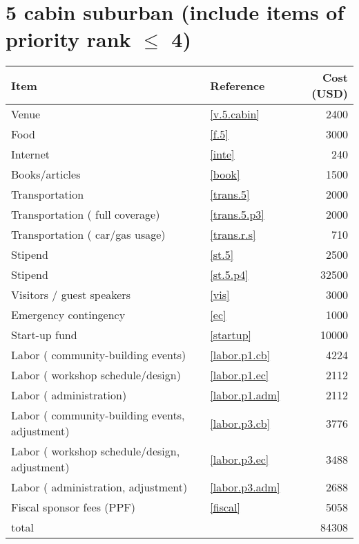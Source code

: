 \section*{5 cabin suburban (include items of priority rank $\leq$ 4)}
\begin{center}
\begin{tabular}{llr}
Item & Reference & Cost (USD) \\ \hline
Venue & \ref{v.5.cabin} & 2400 \\
Food & \ref{f.5} & 3000 \\
Internet & \ref{inte} & 240 \\
Books/articles & \ref{book} & 1500 \\
Transportation & \ref{trans.5} & 2000 \\
Transportation ( full coverage) & \ref{trans.5.p3} & 2000 \\
Transportation ( car/gas usage) & \ref{trans.r.s} & 710 \\
Stipend & \ref{st.5} & 2500 \\
Stipend & \ref{st.5.p4} & 32500 \\
Visitors / guest speakers & \ref{vis} & 3000 \\
Emergency contingency & \ref{ec} & 1000 \\
Start-up fund & \ref{startup} & 10000 \\
Labor ( community-building events) & \ref{labor.p1.cb} & 4224 \\
Labor ( workshop schedule/design) & \ref{labor.p1.ec} & 2112 \\
Labor ( administration) & \ref{labor.p1.adm} & 2112 \\
Labor ( community-building events, adjustment) & \ref{labor.p3.cb} & 3776 \\
Labor ( workshop schedule/design, adjustment) & \ref{labor.p3.ec} & 3488 \\
Labor ( administration, adjustment) & \ref{labor.p3.adm} & 2688 \\
Fiscal sponsor fees (PPF) & \ref{fiscal} & 5058 \\ \hline
total &  & 84308
\end{tabular}
\end{center}
\newpage
